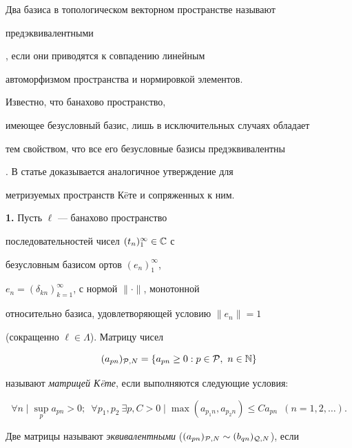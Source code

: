 \maketitle


\label{begin}





Два базиса в топологическом векторном пространстве называют {\it


предэквивалентными}, если они приводятся к совпадению линейным


автоморфизмом пространства и нормировкой элементов.


Известно, что банахово пространство,


имеющее безусловный базис, лишь в исключительных случаях обладает


тем свойством, что все его безусловные базисы предэквивалентны


\cite{1LT}. В статье доказывается аналогичное утверждение для


метризуемых пространств К\"eте и сопряженных к ним.


\medskip





{\bf 1.} Пусть $\ell$ --- банахово пространство


последовательностей чисел $(t_n)_1^\infty\in {\Bbb C}$ с


безусловным базисом ортов $(e_n)_1^\infty$,


$e_n=(\delta_{kn})_{k=1}^\infty$, с нормой $\|\cdot\|$, монотонной


относительно базиса, удовлетворяющей условию $\|e_n\|=1$


(сокращенно $\ell\in\Lambda$). Матрицу чисел


$$


(a_{pn})_{{\cal P},N}=\{a_{pn}\geq 0: p\in{\cal P},\ n\in \Bbb N\}


$$


называют {\it матрицей К\"eте}, если выполняются следующие условия:


$$


\forall n \mid \sup\limits_p a_{pn}>0;\ \;


\forall p_1,p_2\


\exists p,C>0\mid \max (a_{p_1n},a_{p_2n})\leq Ca_{pn} \ \;


(n=1,2,\dotsc).


$$


Две матрицы называют {\it эквивалентными} ($(a_{pn})_{{\cal


P},N}\sim (b_{qn})_{{\cal Q},N}$), если


